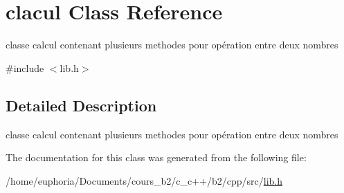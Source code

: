 \hypertarget{classclacul}{}\section{clacul Class Reference}
\label{classclacul}


classe calcul contenant plusieurs methodes pour opération entre deux nombres  




{\ttfamily \#include $<$lib.\+h$>$}



\subsection{Detailed Description}
classe calcul contenant plusieurs methodes pour opération entre deux nombres 

The documentation for this class was generated from the following file\+:\begin{DoxyCompactItemize}
\item 
/home/euphoria/\+Documents/cours\+\_\+b2/c\+\_\+c++/b2/cpp/src/\hyperlink{lib_8h}{lib.\+h}\end{DoxyCompactItemize}
